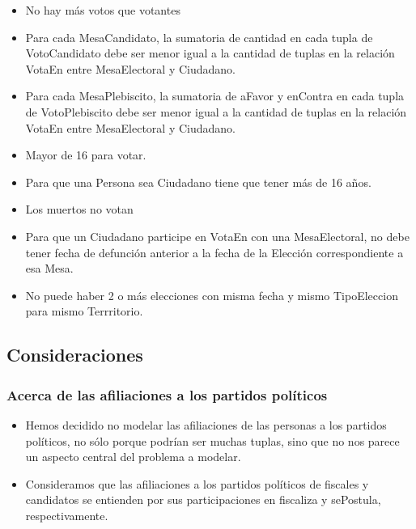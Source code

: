 \begin{itemize}
\item{No hay más votos que votantes}

\item{Para cada MesaCandidato, la sumatoria de cantidad en cada tupla de VotoCandidato debe ser menor igual a la cantidad de tuplas en la relación VotaEn entre MesaElectoral y Ciudadano.}

\item{Para cada MesaPlebiscito, la sumatoria de aFavor y enContra en cada tupla de VotoPlebiscito debe ser menor igual a la cantidad de tuplas en la relación VotaEn entre MesaElectoral y Ciudadano.}

\item{Mayor de 16 para votar.}

\item{Para que una Persona sea Ciudadano tiene que tener más de 16 años.}

\item{Los muertos no votan}

\item{Para que un Ciudadano participe en VotaEn con una MesaElectoral, no debe tener fecha de defunción anterior a la fecha de la Elección correspondiente a esa Mesa.}

\item{No puede haber 2 o más  elecciones con misma fecha y mismo TipoEleccion para mismo Terrritorio.}

\end{itemize}


\subsection{Consideraciones}

\subsubsection{Acerca de las afiliaciones a los partidos políticos}

\begin{itemize}
\item{Hemos decidido no modelar las afiliaciones de las personas a los partidos políticos, no sólo porque podrían ser muchas tuplas, sino que no nos parece un aspecto central del problema a modelar.}

\item{Consideramos que las afiliaciones a los partidos políticos de fiscales y candidatos se entienden por sus participaciones en fiscaliza y sePostula, respectivamente.}
\end{itemize}

